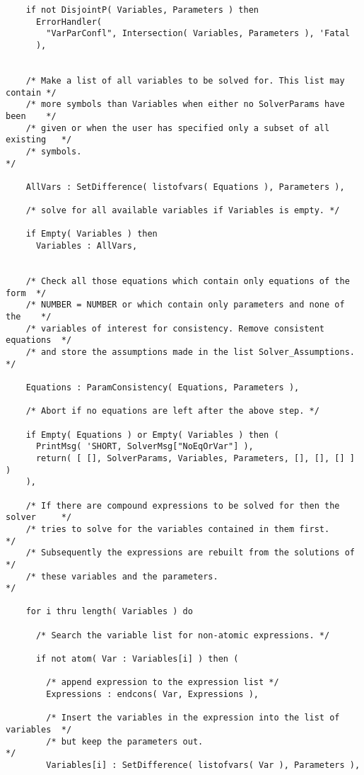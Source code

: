 \begin{verbatim}
    if not DisjointP( Variables, Parameters ) then
      ErrorHandler(
        "VarParConfl", Intersection( Variables, Parameters ), 'Fatal
      ),


    /* Make a list of all variables to be solved for. This list may contain */
    /* more symbols than Variables when either no SolverParams have been    */
    /* given or when the user has specified only a subset of all existing   */
    /* symbols.                                                             */

    AllVars : SetDifference( listofvars( Equations ), Parameters ),

    /* solve for all available variables if Variables is empty. */

    if Empty( Variables ) then
      Variables : AllVars,


    /* Check all those equations which contain only equations of the form  */
    /* NUMBER = NUMBER or which contain only parameters and none of the    */
    /* variables of interest for consistency. Remove consistent equations  */
    /* and store the assumptions made in the list Solver_Assumptions.      */

    Equations : ParamConsistency( Equations, Parameters ),

    /* Abort if no equations are left after the above step. */

    if Empty( Equations ) or Empty( Variables ) then (
      PrintMsg( 'SHORT, SolverMsg["NoEqOrVar"] ),
      return( [ [], SolverParams, Variables, Parameters, [], [], [] ] )
    ),

    /* If there are compound expressions to be solved for then the solver     */
    /* tries to solve for the variables contained in them first.              */
    /* Subsequently the expressions are rebuilt from the solutions of         */
    /* these variables and the parameters.                                    */

    for i thru length( Variables ) do

      /* Search the variable list for non-atomic expressions. */

      if not atom( Var : Variables[i] ) then (

        /* append expression to the expression list */
        Expressions : endcons( Var, Expressions ),

        /* Insert the variables in the expression into the list of variables  */
        /* but keep the parameters out.                                       */
        Variables[i] : SetDifference( listofvars( Var ), Parameters ),


\end{verbatim}
